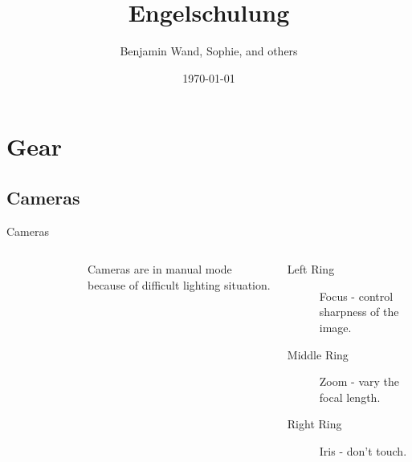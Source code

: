 \documentclass[hyperref={pdfpagelabels=false}]{beamer}
\title{Engelschulung}    %
\author{Benjamin Wand, Sophie, and others}   %
\date{\today}
\begin{document}
\begin{frame}
\titlepage
\end{frame} 


\begin{frame}  
\tableofcontents
\end{frame} 

\section{Gear}  %
\subsection{Cameras}
\begin{frame}{Cameras}
	\begin{columns}[T,onlytextwidth]
	\begin{figure} 
		\centering
		\def\svgwidth{1\textwidth}
		
	\end{figure}
	Cameras are in manual mode because of difficult lighting situation.
	\begin{description}
		\item[Left Ring] Focus - control sharpness of the image.
		\item[Middle Ring] Zoom - vary the focal length.
		\item[Right Ring] Iris - don't touch.
     \end{description}
\end{columns}
\end{frame}
\end{document}
